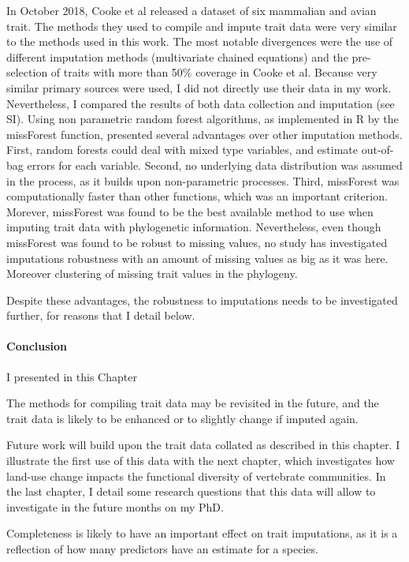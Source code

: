 In October 2018, Cooke et al released a dataset of six mammalian and avian trait. The methods they used to compile and impute trait data were very similar to the methods used in this work. The most notable divergences were the use of different imputation methods (multivariate chained equations) and the pre-selection of traits with more than 50\% coverage in Cooke et al. Because very similar primary sources were used, I did not directly use their data in my work. Nevertheless, I compared the results of both data collection and imputation (see SI). 
Using non parametric random forest algorithms, as implemented in R by the missForest function, presented several advantages over other imputation methods. First, random forests could deal with mixed type variables, and estimate out-of-bag errors for each variable. Second, no underlying data distribution was assumed in the process, as it builds upon non-parametric processes. Third, missForest was computationally faster than other functions, which was an important criterion. Morever, missForest was found to be the best available method to use when imputing trait data with phylogenetic information. Nevertheless, even though missForest was found to be robust to missing values, no study has investigated imputations robustness with an amount of missing values as big as it was here. Moreover clustering of missing trait values in the phylogeny.

Despite these advantages, the robustness to imputations needs to be investigated further, for reasons that I detail below.


\paragraph{Conclusion}

I presented in this Chapter  

The methods for compiling trait data may be revisited in the future, and the trait data is likely to be enhanced or to slightly change if imputed again.

Future work will build upon the trait data collated as described in this chapter. I illustrate the first use of this data with the next chapter, which investigates how land-use change impacts the functional diversity of vertebrate communities. In the last chapter, I detail some research questions that this data will allow to investigate in the future months on my PhD.


Completeness is likely to have an important effect on trait imputations, as it is a reflection of how many predictors have an estimate for a species.